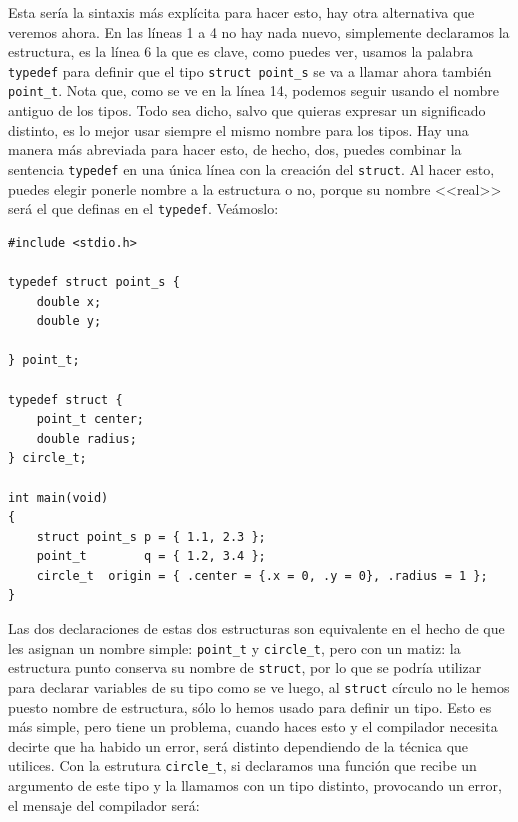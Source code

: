 \documentclass[a4paper]{article}
\begin{document}
Esta sería la sintaxis más explícita para hacer esto, hay otra alternativa que
veremos ahora.
En las líneas 1 a 4 no hay nada nuevo, simplemente declaramos la estructura,
es la línea 6 la que es clave, como puedes ver, usamos la palabra
\verb!typedef! para definir que el tipo \verb!struct point_s! se va a llamar
ahora también \verb!point_t!. Nota que, como se ve en la línea 14, podemos
seguir usando el nombre antiguo de los tipos. Todo sea dicho, salvo que quieras
expresar un significado distinto, es lo mejor usar siempre el mismo nombre para los
tipos. Hay una manera más abreviada para hacer esto, de hecho, dos, puedes
combinar la sentencia \verb!typedef! en una única línea con la creación del
\verb!struct!. Al hacer esto, puedes elegir ponerle nombre a la estructura o no,
porque su nombre <<real>> será el que definas en el \verb!typedef!. Veámoslo:


\noindent
\begin{minipage}[H]{\linewidth}
\mbox{}
\begin{lstlisting}[style=C,
caption={Diferentes combinaciones de \texttt{struct} con \texttt{typedef}},
label={lst:structTypeCombo}]
#include <stdio.h>

typedef struct point_s {
    double x;
    double y;

} point_t;

typedef struct {
    point_t center;
    double radius;
} circle_t;

int main(void)
{
    struct point_s p = { 1.1, 2.3 };
    point_t        q = { 1.2, 3.4 };
    circle_t  origin = { .center = {.x = 0, .y = 0}, .radius = 1 };
}
\end{lstlisting}
\end{minipage}

Las dos declaraciones de estas dos estructuras son equivalente en el hecho
de que les asignan un nombre simple: \verb!point_t! y \verb!circle_t!, pero con
un matiz: la estructura punto conserva su nombre de \verb!struct!, por lo que
se podría utilizar para declarar variables de su tipo como se ve luego, al
\verb!struct! círculo no le hemos puesto nombre de estructura, sólo lo hemos
usado para definir un tipo. Esto es más simple, pero tiene un problema, cuando
haces esto y el compilador necesita decirte que ha habido un error, será
distinto dependiendo de la técnica que utilices. Con la estrutura
\verb!circle_t!, si declaramos una función que recibe un argumento de este tipo
y la llamamos con un tipo distinto, provocando un error, el mensaje del
compilador será:
\end{document}
